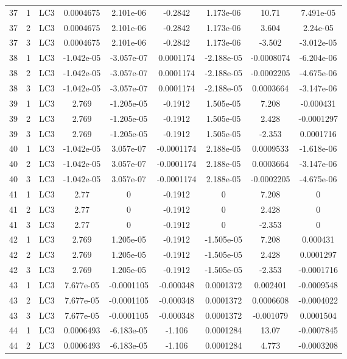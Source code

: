 \documentclass{article}%
\begin{document}
\begin{longtable}{| c c c | c c c c c c |}
37&1&LC3&0.0004675&2.101e{-}06&{-}0.2842&1.173e{-}06&10.71&7.491e{-}05\\%
37&2&LC3&0.0004675&2.101e{-}06&{-}0.2842&1.173e{-}06&3.604&2.24e{-}05\\%
37&3&LC3&0.0004675&2.101e{-}06&{-}0.2842&1.173e{-}06&{-}3.502&{-}3.012e{-}05\\%
38&1&LC3&{-}1.042e{-}05&{-}3.057e{-}07&0.0001174&{-}2.188e{-}05&{-}0.0008074&{-}6.204e{-}06\\%
38&2&LC3&{-}1.042e{-}05&{-}3.057e{-}07&0.0001174&{-}2.188e{-}05&{-}0.0002205&{-}4.675e{-}06\\%
38&3&LC3&{-}1.042e{-}05&{-}3.057e{-}07&0.0001174&{-}2.188e{-}05&0.0003664&{-}3.147e{-}06\\%
39&1&LC3&2.769&{-}1.205e{-}05&{-}0.1912&1.505e{-}05&7.208&{-}0.000431\\%
39&2&LC3&2.769&{-}1.205e{-}05&{-}0.1912&1.505e{-}05&2.428&{-}0.0001297\\%
39&3&LC3&2.769&{-}1.205e{-}05&{-}0.1912&1.505e{-}05&{-}2.353&0.0001716\\%
40&1&LC3&{-}1.042e{-}05&3.057e{-}07&{-}0.0001174&2.188e{-}05&0.0009533&{-}1.618e{-}06\\%
40&2&LC3&{-}1.042e{-}05&3.057e{-}07&{-}0.0001174&2.188e{-}05&0.0003664&{-}3.147e{-}06\\%
40&3&LC3&{-}1.042e{-}05&3.057e{-}07&{-}0.0001174&2.188e{-}05&{-}0.0002205&{-}4.675e{-}06\\%
41&1&LC3&2.77&0&{-}0.1912&0&7.208&0\\%
41&2&LC3&2.77&0&{-}0.1912&0&2.428&0\\%
41&3&LC3&2.77&0&{-}0.1912&0&{-}2.353&0\\%
42&1&LC3&2.769&1.205e{-}05&{-}0.1912&{-}1.505e{-}05&7.208&0.000431\\%
42&2&LC3&2.769&1.205e{-}05&{-}0.1912&{-}1.505e{-}05&2.428&0.0001297\\%
42&3&LC3&2.769&1.205e{-}05&{-}0.1912&{-}1.505e{-}05&{-}2.353&{-}0.0001716\\%
43&1&LC3&7.677e{-}05&{-}0.0001105&{-}0.000348&0.0001372&0.002401&{-}0.0009548\\%
43&2&LC3&7.677e{-}05&{-}0.0001105&{-}0.000348&0.0001372&0.0006608&{-}0.0004022\\%
43&3&LC3&7.677e{-}05&{-}0.0001105&{-}0.000348&0.0001372&{-}0.001079&0.0001504\\%
44&1&LC3&0.0006493&{-}6.183e{-}05&{-}1.106&0.0001284&13.07&{-}0.0007845\\%
44&2&LC3&0.0006493&{-}6.183e{-}05&{-}1.106&0.0001284&4.773&{-}0.0003208\\%

\end{longtable}
\end{document}
